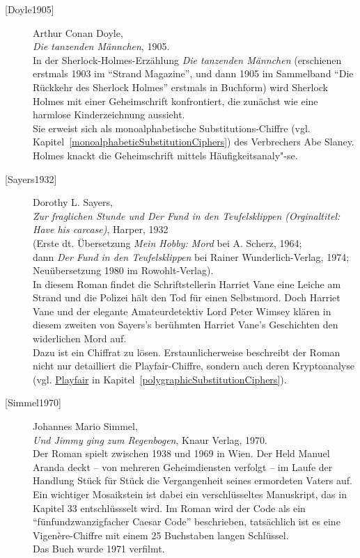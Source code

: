 \begin{refsegment}
\begin{description}
\item[\textrm{[Doyle1905]}] 
    Arthur Conan Doyle, \\
    {\em Die tanzenden Männchen}, 1905. \\
    In der Sherlock-Holmes-Erzählung {\em Die tanzenden Männchen}
    (erschienen erstmals 1903 im "`Strand Magazine"', und dann 1905 im
    Sammelband "`Die Rückkehr des Sherlock Holmes"' erstmals in Buchform)
    wird Sherlock Holmes mit einer Geheimschrift konfrontiert, die zunächst
    wie eine harmlose Kinderzeichnung aussieht. \\
    Sie erweist sich als monoalphabetische Substitutions-Chiffre (vgl.
    Kapitel~\ref{monoalphabeticSubstitutionCiphers}) des Verbrechers Abe
    Slaney. Holmes knackt die Geheimschrift mittels Häufigkeitsanaly"-se.\\


\item[\textrm{[Sayers1932]}] 
    Dorothy L. Sayers, \\
    {\em Zur fraglichen Stunde und Der Fund in den Teufelsklippen
    (Orginaltitel: Have his carcase)}, Harper, 1932 \\
    (Erste dt. Übersetzung {\em Mein Hobby: Mord} bei A. Scherz, 1964; \\
    dann {\em Der Fund in den Teufelsklippen} bei Rainer Wunderlich-Verlag,
    1974;\\
    Neuübersetzung 1980 im Rowohlt-Verlag). \\
    In diesem Roman findet die Schriftstellerin Harriet Vane eine Leiche
    am Strand und die Polizei hält den Tod für einen Selbstmord.
    Doch Harriet Vane und der elegante Amateurdetektiv Lord Peter Wimsey
    klären in diesem zweiten von Sayers's berühmten Harriet Vane's
    Geschichten den widerlichen Mord auf. \\
    Dazu ist ein Chiffrat zu lösen. Erstaunlicherweise beschreibt der
    Roman nicht nur detailliert die Playfair-Chiffre, sondern auch deren
    Kryptoanalyse (vgl. \hyperlink{playfair}{Playfair}
    in Kapitel~\ref{polygraphicSubstitutionCiphers}).\\


\item[\textrm{[Simmel1970]}] 
    Johannes Mario Simmel, \\
    {\em Und Jimmy ging zum Regenbogen}, Knaur Verlag, 1970. \\
    Der Roman spielt zwischen 1938 und
    1969 in Wien. Der Held Manuel Aranda deckt -- von mehreren Geheimdiensten
    verfolgt -- im Laufe der Handlung Stück für Stück die Vergangenheit seines
    ermordeten Vaters auf. Ein wichtiger Mosaikstein ist dabei ein
    verschlüsseltes Manuskript, das in Kapitel 33 entschlüssselt wird.
    Im Roman wird der Code als ein
    "`fünfundzwanzigfacher Caesar Code"' beschrieben, tatsächlich ist es eine
    Vigenère-Chiffre mit einem 25 Buchstaben langen Schlüssel. \\
    Das Buch wurde 1971 verfilmt.\\



\end{description}
\end{refsegment}
